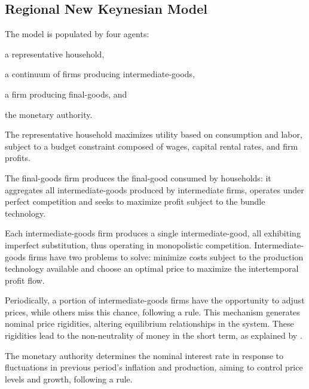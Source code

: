 \documentclass[../thesis.tex]{subfiles}
\begin{document}
\newpage


\subsection{Regional New Keynesian Model}\label{sec_v6:nk-model}

	The model is populated by four agents: 
	\begin{enumerate*}[label=(\arabic*)]
	\item a representative household,
	\item a continuum of firms producing intermediate-goods,
	\item a firm producing final-goods, and
	\item the monetary authority.
	\end{enumerate*}

	The representative household maximizes utility based on consumption and labor, subject to a budget constraint composed of wages, capital rental rates, and firm profits.
	
	The final-goods firm produces the final-good consumed by households: it aggregates all intermediate-goods produced by intermediate firms, operates under perfect competition and seeks to maximize profit subject to the bundle technology.
	
	Each intermediate-goods firm produces a single intermediate-good, all exhibiting imperfect substitution, thus operating in monopolistic competition. Intermediate-goods firms have two problems to solve: minimize costs subject to the production technology available and choose an optimal price to maximize the intertemporal profit flow.
	
	Periodically, a portion of intermediate-goods firms have the opportunity to adjust prices, while others miss this chance, following a \textcite{calvo_staggered_1983} rule. This mechanism generates nominal price rigidities, altering equilibrium relationships in the system. These rigidities lead to the non-neutrality of money in the short term, as explained by \textcite[p.191]{costa_junior_understanding_2016}.
	
	The monetary authority determines the nominal interest rate in response to fluctuations in previous period's inflation and production, aiming to control price levels and growth, following a \textcite{taylor_discretion_1993} rule.
	
\end{document}

